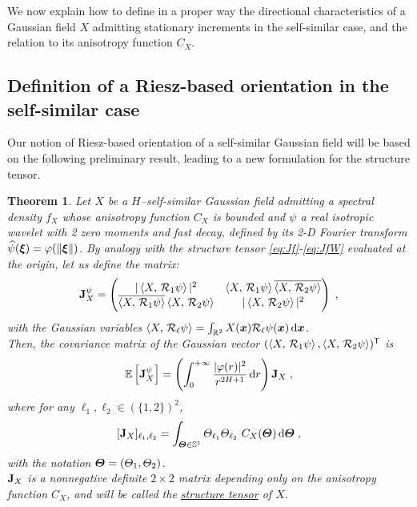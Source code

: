 \documentclass{elsarticle}
\newtheorem{theorem}{Theorem}
\begin{document}
\noindent We now explain how to define in a proper way the directional characteristics of a Gaussian field $X$ admitting stationary increments in the self-similar case, and the relation to its anisotropy function $C_X$.   

\subsection{Definition of a Riesz-based orientation in the self-similar case\\}\label{s:wav:based:orientation:ssi}

Our notion of Riesz-based orientation of a self-similar Gaussian field will be based on the following preliminary result, leading to a new formulation for the structure tensor.
%
\begin{theorem}\label{pro:wav:based:orientation}
Let $X$ be a $H$--self-similar Gaussian field admitting a spectral density $f_X$ whose anisotropy function $C_X$ is bounded and $\psi$ a real isotropic wavelet with 2 zero moments and fast decay, defined by its 2-D Fourier transform $\widehat \psi(\bm{\xi})=\varphi(\left\lVert\bm{\xi}\right\rVert)$. %
By analogy with the structure tensor \eqref{eq:Jf}-\eqref{eq:JfW} evaluated at the origin, let us define the matrix:
\[
\mathbf{J}_X^{\psi}= \begin{pmatrix} |\left \langle X,\, \mathcal{R}_1 \psi\right \rangle|^2 & \left \langle X,\, \mathcal{R}_1 \psi\right \rangle\overline{\left \langle X,\, \mathcal{R}_2 \psi\right \rangle} \\  \overline{\left \langle X,\, \mathcal{R}_1 \psi\right \rangle}\left \langle X,\, \mathcal{R}_2 \psi\right \rangle  &  |\left \langle X,\, \mathcal{R}_2 \psi\right \rangle|^2\end{pmatrix}\;,
\]
with the Gaussian variables $ \left \langle X,\, \mathcal{R}_{\ell} \psi\right \rangle = \int_{ \mathbb{R}^2}^{} X(\bm{x}) \mathcal{R}_{\ell} \psi(\bm{x})\mathop{}\mathopen{}\mathrm{d} \bm{x}$. \\
Then, the covariance matrix of the Gaussian vector $(\left \langle X,\, \mathcal{R}_1 \psi\right \rangle,\left \langle X,\, \mathcal{R}_2 \psi\right \rangle)^{\mathsf{T}}$ is
\[
\mathbb{E} \left[\mat{J}_{X}^{\psi} \right]=\left(\int_{0}^{+\infty}\frac{| \varphi(r)|^2}{r^{2H+1}}\dif r\right)\mat{J}_X\;,
\]
where  for any $\ell_1,\ell_2\in (\{1,2\})^2$,
\begin{equation}
\label{def:newtensor}
[\mat{J}_X]_{\ell_1,\ell_2}=\int_{\vect{\Theta}\in\mathbb{S}^{1}} {\Theta}_{\ell_1}{\Theta}_{\ell_2}~C_X(\vect{\Theta})\dif \vect{\Theta}\;,
\end{equation}
with the notation $\bm{\Theta}=(\Theta_1,\Theta_2)$.\\
$\mathbf{J}_X$ is a nonnegative definite $2\times2$ matrix depending only on the anisotropy function $C_X$, and will be called the 
\underline{structure tensor} of $X$. 
\end{theorem}
\end{document}
